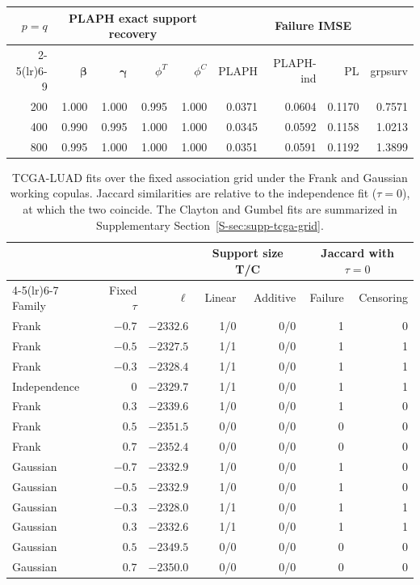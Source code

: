 \begin{table}[!htbp]
\centering

\label{tab:dimension-main}
\small
\begin{tabular}{rrrrrrrrr}
\toprule
\(p=q\) & \multicolumn{4}{c}{PLAPH exact support recovery} & \multicolumn{4}{c}{Failure IMSE} \\
\cmidrule(lr){2-5}\cmidrule(lr){6-9}
& \(\boldsymbol\beta\) & \(\boldsymbol\gamma\) & \(\phi^T\) & \(\phi^C\) & PLAPH & PLAPH-ind & PL & grpsurv\\
\midrule
200 & 1.000 & 1.000 & 0.995 & 1.000 & 0.0371 & 0.0604 & 0.1170 & 0.7571\\
400 & 0.990 & 0.995 & 1.000 & 1.000 & 0.0345 & 0.0592 & 0.1158 & 1.0213\\
800 & 0.995 & 1.000 & 1.000 & 1.000 & 0.0351 & 0.0591 & 0.1192 & 1.3899\\
\bottomrule
\end{tabular}
\end{table}

\begin{table}[!htbp]
\centering
\caption{TCGA-LUAD fits over the fixed association grid under the Frank and Gaussian working copulas. Jaccard similarities are relative to the independence fit ($\tau=0$), at which the two coincide. The Clayton and Gumbel fits are summarized in Supplementary Section~\ref{S-sec:supp-tcga-grid}.}
\label{tab:luad-grid-main}
\small
\setlength{\tabcolsep}{5pt}
\begin{tabular}{lrrrrrr}
\toprule
& & & \multicolumn{2}{c}{Support size T/C} & \multicolumn{2}{c}{Jaccard with $\tau=0$} \\
\cmidrule(lr){4-5}\cmidrule(lr){6-7}
Family & Fixed $\tau$ & $\ell$ & Linear & Additive & Failure & Censoring \\
\midrule
Frank & $-0.7$ & $-2332.6$ & 1/0 & 0/0 & 1 & 0 \\
Frank & $-0.5$ & $-2327.5$ & 1/1 & 0/0 & 1 & 1 \\
Frank & $-0.3$ & $-2328.4$ & 1/1 & 0/0 & 1 & 1 \\
Independence & $0$ & $-2329.7$ & 1/1 & 0/0 & 1 & 1 \\
Frank & $0.3$ & $-2339.6$ & 1/0 & 0/0 & 1 & 0 \\
Frank & $0.5$ & $-2351.5$ & 0/0 & 0/0 & 0 & 0 \\
Frank & $0.7$ & $-2352.4$ & 0/0 & 0/0 & 0 & 0 \\
\addlinespace
Gaussian & $-0.7$ & $-2332.9$ & 1/0 & 0/0 & 1 & 0 \\
Gaussian & $-0.5$ & $-2332.9$ & 1/0 & 0/0 & 1 & 0 \\
Gaussian & $-0.3$ & $-2328.0$ & 1/1 & 0/0 & 1 & 1 \\
Gaussian & $0.3$ & $-2332.6$ & 1/1 & 0/0 & 1 & 1 \\
Gaussian & $0.5$ & $-2349.5$ & 0/0 & 0/0 & 0 & 0 \\
Gaussian & $0.7$ & $-2350.0$ & 0/0 & 0/0 & 0 & 0 \\
\bottomrule
\end{tabular}
\end{table}
